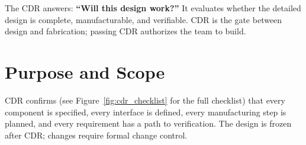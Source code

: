 \documentclass[11pt,letterpaper,twoside,openany]{book}
\begin{document}
\vspace{1em}

The CDR answers: \textbf{``Will this design work?''} It evaluates whether the detailed design is complete, manufacturable, and verifiable. CDR is the gate between design and fabrication; passing CDR authorizes the team to build.

\vspace{1em}

\section{Purpose and Scope}
CDR confirms (see Figure~\ref{fig:cdr_checklist} for the full checklist) that every component is specified, every interface is defined, every manufacturing step is planned, and every requirement has a path to verification. The design is frozen after CDR; changes require formal change control.
\end{document}
